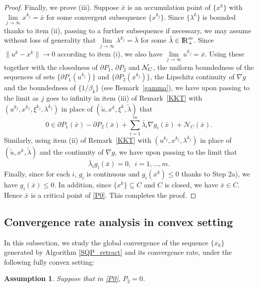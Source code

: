 \documentclass[10pt]{article}
\numberwithin{equation}{section}
\newtheorem{assumption}{Assumption}[section]
\def\R{{\rm I\!R}}
\begin{document}
\begin{proof}
Finally, we prove (iii). Suppose $\bar{x}$ is an accumulation point of $\{x^k\}$ with $\lim\limits_{j\rightarrow\infty}x^{k_j} = \bar{x}$ for some convergent subsequence $\{x^{k_j}\}$. Since $\{\lambda^k\}$ is bounded thanks to item (ii), passing to a further subsequence if necessary, we may assume without loss of generality that $\lim\limits_{j\rightarrow\infty}\lambda^{k_j} = \bar{\lambda}$ for some $\bar\lambda\in \R^m_+$. Since $\|u^k - x^k\|\rightarrow 0$ according to item (i), we also have $\lim\limits_{j\rightarrow\infty}u^{k_j} = \bar{x}$.
Using these together with the closedness of $\partial P_1$, $\partial P_2$ and ${\cal N}_C$, the uniform boundedness of the sequences of sets $\{\partial P_1(u^{k_j})\}$ and $\{\partial P_2(x^{k_j})\}$, the Lipschitz continuity of $\nabla g$ and the boundedness of $\{1/\beta_k\}$ (see Remark~\ref{gamma}), we have upon passing to the limit as $j$ goes to infinity in item (iii) of Remark~\ref{KKT} with $(u^{k_j},x^{k_j},\xi^{k_j},\lambda^{k_j})$ in place of $(\widetilde u,x^k,\xi^k,\widetilde\lambda)$ that
\[
0\in \partial P_1(\bar{x}) - \partial P_2(\bar{x}) + \sum\limits_{i=1}^m\bar{\lambda}_i\nabla g_i(\bar{x}) + \mathcal{N}_C(\bar{x}).
\]
Similarly, using item (ii) of Remark~\ref{KKT} with $(u^{k_j},x^{k_j},\lambda^{k_j})$ in place of $(\widetilde u,x^k,\widetilde\lambda)$ and the continuity of $\nabla g$, we have upon passing to the limit that
\[
\bar{\lambda}_i g_i(\bar{x}) = 0,\ \ i = 1, \ldots, m.
\]
Finally, since for each $i$, $g_i$ is continuous and $g_i(x^k)\leq0$ thanks to Step 2a), we have $g_i(\bar{x})\leq0$. In addition, since $\{x^k\}\subseteq C$ and $C$ is closed, we have $\bar{x}\in C$. Hence $\bar{x}$ is a critical point of \eqref{P0}. This completes the proof.
\end{proof}

\subsection{Convergence rate analysis in convex setting}
In this subsection, we study the global convergence of the sequence $\{x_k\}$ generated by Algorithm \ref{SQP_retract} and its convergence rate, under the following fully convex setting:
\begin{assumption}\label{assumption3}
  Suppose that in \eqref{P0}, $P_2 = 0$.
\end{assumption}
\end{document}
